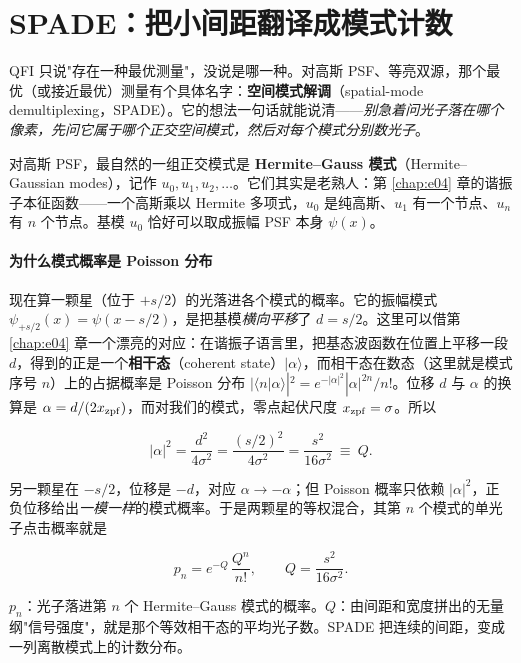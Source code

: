\section{SPADE：把小间距翻译成模式计数}
\label{sec:e12-spade}

QFI 只说"存在一种最优测量"，没说是哪一种。对高斯 PSF、等亮双源，那个最优（或接近最优）测量有个具体名字：\textbf{空间模式解调}（spatial-mode demultiplexing，SPADE）。它的想法一句话就能说清——\emph{别急着问光子落在哪个像素，先问它属于哪个正交空间模式，然后对每个模式分别数光子}。

对高斯 PSF，最自然的一组正交模式是 \textbf{Hermite--Gauss 模式}（Hermite--Gaussian modes），记作 \(u_0,u_1,u_2,\dots\)。它们其实是老熟人：第 \ref{chap:e04} 章的谐振子本征函数——一个高斯乘以 Hermite 多项式，\(u_0\) 是纯高斯、\(u_1\) 有一个节点、\(u_n\) 有 \(n\) 个节点。基模 \(u_0\) 恰好可以取成振幅 PSF 本身 \(\psi(x)\)。

\paragraph{为什么模式概率是 Poisson 分布}
\label{sec:e12-poisson}

现在算一颗星（位于 \(+s/2\)）的光落进各个模式的概率。它的振幅模式 \(\psi_{+s/2}(x)=\psi(x-s/2)\)，是把基模\emph{横向平移}了 \(d=s/2\)。这里可以借第 \ref{chap:e04} 章一个漂亮的对应：在谐振子语言里，把基态波函数在位置上平移一段 \(d\)，得到的正是一个\textbf{相干态}（coherent state）\(|\alpha\rangle\)，而相干态在数态（这里就是模式序号 \(n\)）上的占据概率是 Poisson 分布 \(|\langle n|\alpha\rangle|^2=e^{-|\alpha|^2}|\alpha|^{2n}/n!\)。位移 \(d\) 与 \(\alpha\) 的换算是 \(\alpha=d/(2x_{\rm zpf})\)，而对我们的模式，零点起伏尺度 \(x_{\rm zpf}=\sigma\)。所以

\[
  |\alpha|^{2}=\frac{d^{2}}{4\sigma^{2}}
  =\frac{(s/2)^{2}}{4\sigma^{2}}
  =\frac{s^{2}}{16\sigma^{2}}\ \equiv\ Q.
\]

另一颗星在 \(-s/2\)，位移是 \(-d\)，对应 \(\alpha\to-\alpha\)；但 Poisson 概率只依赖 \(|\alpha|^2\)，正负位移给出\emph{一模一样}的模式概率。于是两颗星的等权混合，其第 \(n\) 个模式的单光子点击概率就是

\begin{equation}
  p_{n}=e^{-Q}\,\frac{Q^{n}}{n!},
  \qquad
  Q=\frac{s^{2}}{16\sigma^{2}}.
  \label{eq:e12-spade-prob}
\end{equation}
\begin{formulaexplain}
\(p_n\)：光子落进第 \(n\) 个 Hermite--Gauss 模式的概率。\(Q\)：由间距和宽度拼出的无量纲"信号强度"，就是那个等效相干态的平均光子数。SPADE 把连续的间距，变成一列离散模式上的计数分布。
\end{formulaexplain}

